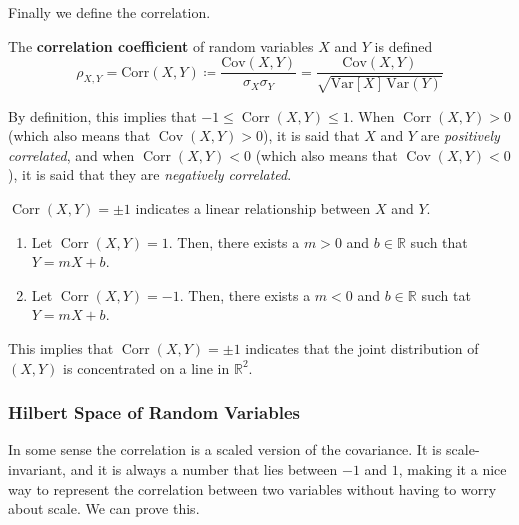 \documentclass{article}
\DeclareMathOperator{\Cov}{Cov}
\DeclareMathOperator{\Corr}{Corr}
\begin{document}
    Finally we define the correlation. 

    \begin{definition}
      The \textbf{correlation coefficient} of random variables $X$ and $Y$ is defined 
      \begin{equation}
        \rho_{X, Y} = \mathrm{Corr}(X, Y) \coloneqq \frac{\mathrm{Cov}(X, Y)}{\sigma_X \sigma_Y} = \frac{\mathrm{Cov}(X, Y)}{\sqrt{\mathrm{Var}[X] \, \mathrm{Var}(Y)}}
      \end{equation}
    \end{definition}

    By definition, this implies that $-1 \leq \Corr(X, Y) \leq 1$. When $\Corr(X, Y) > 0$ (which also means that $\Cov(X, Y) > 0$), it is said that $X$ and $Y$ are \textit{positively correlated}, and when $\Corr(X, Y) < 0$ (which also means that $\Cov(X, Y) < 0$), it is said that they are \textit{negatively correlated}. 

    \begin{theorem}
      $\Corr(X,Y) = \pm 1$ indicates a linear relationship between $X$ and $Y$. 
      \begin{enumerate}
        \item Let $\Corr(X, Y) = 1$. Then, there exists a $m>0$ and $b \in \mathbb{R}$ such that $Y = m X + b$. 
        \item Let $\Corr(X, Y) = -1$. Then, there exists a $m<0$ and $b \in \mathbb{R}$ such tat $Y = m X + b$. 
      \end{enumerate}
      This implies that $\Corr(X, Y) = \pm 1$ indicates that the joint distribution of $(X, Y)$ is concentrated on a line in $\mathbb{R}^2$. 
    \end{theorem}

    \subsubsection{Hilbert Space of Random Variables}

      In some sense the correlation is a scaled version of the covariance. It is scale-invariant, and it is always a number that lies between $-1$ and $1$, making it a nice way to represent the correlation between two variables without having to worry about scale. We can prove this. 
\end{document}
